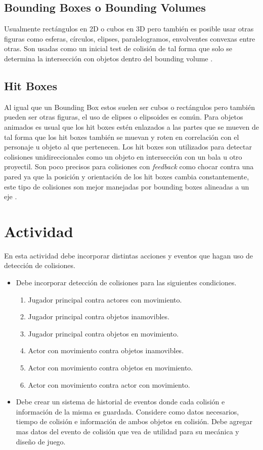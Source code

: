 \subsection{Bounding Boxes o Bounding Volumes}
Usualmente rectángulos en 2D o cubos en 3D pero también es posible usar otras figuras como esferas, círculos, elipses, paralelogramos, envolventes convexas entre otras. Son usadas como un inicial test de colisión de tal forma que solo se determina la intersección con objetos dentro del bounding volume \cite{douglas_bbox}.
\subsection{Hit Boxes}
Al igual que un Bounding Box estos suelen ser cubos o rectángulos pero también pueden ser otras figuras, el uso de elipses o elipsoides es común. Para objetos animados es usual que los hit boxes estén enlazados a las partes que se mueven de tal forma que los hit boxes también se muevan y roten en correlación con el personaje u objeto al que pertenecen. Los hit boxes son utilizados para detectar colisiones unidireccionales como un objeto en intersección con un bala u otro proyectil. Son poco precisos para colisiones con \emph{feedback} como chocar contra una pared ya que la posición y orientación de los hit boxes cambia constantemente, este tipo de colisiones son mejor manejadas por bounding boxes alineadas a un eje \cite{valve_hit}. 

\section{Actividad}
En esta actividad debe incorporar distintas acciones y eventos que hagan uso de detección de colisiones.
\begin{itemize}
\item Debe incorporar detección de colisiones para las siguientes condiciones.
\begin{enumerate}
  \item Jugador principal contra actores con movimiento.
  \item Jugador principal contra objetos inamovibles.
  \item Jugador principal contra objetos en movimiento.
  \item Actor con movimiento contra objetos inamovibles.
  \item Actor con movimiento contra objetos en movimiento.
  \item Actor con movimiento contra actor con movimiento.
\end{enumerate}
 \item Debe crear un sistema de historial de eventos donde cada colisión e información de la misma es guardada. Considere como datos necesarios, tiempo de colisión e información de ambos objetos en colisión. Debe agregar mas datos del evento de colisión que vea de utilidad para su mecánica y diseño de juego.
\end{itemize}